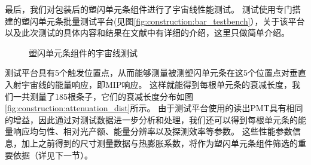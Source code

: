 最后，我们对包装后的塑闪单元条组件进行了宇宙线性能测试。
测试使用专门搭建的塑闪单元条批量测试平台(见图\ref{fig:construction:bar_testbench}），关于该平台以及此次测试的具体内容和结果在文献\parencite{bar_test_2015}中有详细的介绍，这里只做简单介绍。
\begin{figure}[htb]
\centering
{}
\caption{塑闪单元条组件的宇宙线测试}
\label{fig:construction:bar_cosmictest}
\end{figure}
测试平台具有5个触发位置点，从而能够测量被测塑闪单元条在这5个位置点对垂直入射宇宙线的能量响应，即MIP响应。
这样就能得到每根单元条的衰减长度，我们一共测量了185根条子，它们的衰减长度分布如图\ref{fig:construction:attenuation_dist}所示。
由于测试平台使用的读出PMT具有相同的增益\parencite{bar_test_2015}，因此通过对测试数据进一步分析和处理，我们还可以得到每根单元条的能量响应均匀性、相对光产额、能量分辨率以及探测效率等参数。
这些性能参数信息，加上之前得到的尺寸测量数据与热膨胀系数，将作为塑闪单元条组件筛选的重要依据（详见下一节）。

